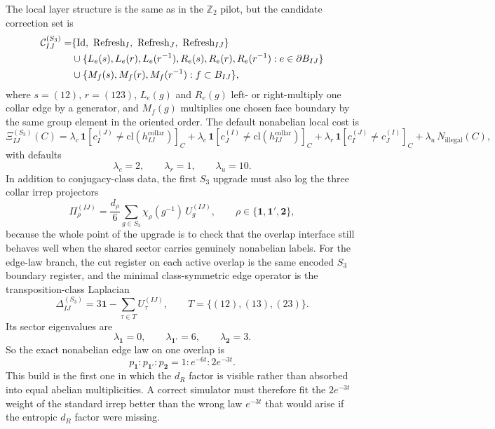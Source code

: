 \documentclass[11pt]{article}
\begin{document}
The local layer structure is the same as in the $\mathbb Z_2$ pilot, but the candidate correction
set is
\begin{align}
\mathcal C_{IJ}^{(S_3)}
=&
\{\mathrm{Id},\ \mathrm{Refresh}_I,\ \mathrm{Refresh}_J,\ \mathrm{Refresh}_{IJ}\}\notag\\
&\cup
\{L_e(s),L_e(r),L_e(r^{-1}),R_e(s),R_e(r),R_e(r^{-1}) : e\in \partial B_{IJ}\}\notag\\
&\cup
\{M_f(s),M_f(r),M_f(r^{-1}) : f\subset B_{IJ}\},
\end{align}
where $s=(12)$, $r=(123)$, $L_e(g)$ and $R_e(g)$ left- or right-multiply one collar edge by a
generator, and $M_f(g)$ multiplies one chosen face boundary by the same group element in the
oriented order. The default nonabelian local cost is
\begin{equation}
\Xi_{IJ}^{(S_3)}(C)
=
\lambda_c\,\mathbf 1[c_I^{(J)}\neq \mathrm{cl}(h_{IJ}^{\mathrm{collar}})]_C
+
\lambda_c\,\mathbf 1[c_J^{(I)}\neq \mathrm{cl}(h_{IJ}^{\mathrm{collar}})]_C
+
\lambda_r\,\mathbf 1[c_I^{(J)}\neq c_J^{(I)}]_C
+
\lambda_u\,N_{\mathrm{illegal}}(C),
\end{equation}
with defaults
\begin{equation}
\lambda_c=2,\qquad \lambda_r=1,\qquad \lambda_u=10.
\end{equation}
In addition to conjugacy-class data, the first $S_3$ upgrade must also log the three collar
irrep projectors
\begin{equation}
\Pi_{\rho}^{(IJ)}
=
\frac{d_{\rho}}{6}\sum_{g\in S_3}\chi_{\rho}(g^{-1})\,U_g^{(IJ)},
\qquad
\rho\in\{\mathbf 1,\mathbf 1',\mathbf 2\},
\end{equation}
because the whole point of the upgrade is to check that the overlap interface still behaves well
when the shared sector carries genuinely nonabelian labels.
For the edge-law branch, the cut register on each active overlap is the same encoded $S_3$
boundary register, and the minimal class-symmetric edge operator is the transposition-class
Laplacian
\begin{equation}
\Delta_{IJ}^{(S_3)}
=
3\mathbf 1-\sum_{\tau\in T}U_{\tau}^{(IJ)},
\qquad
T=\{(12),(13),(23)\}.
\end{equation}
Its sector eigenvalues are
\begin{equation}
\lambda_{\mathbf 1}=0,
\qquad
\lambda_{\mathbf 1'}=6,
\qquad
\lambda_{\mathbf 2}=3.
\end{equation}
So the exact nonabelian edge law on one overlap is
\begin{equation}
p_{\mathbf 1}:p_{\mathbf 1'}:p_{\mathbf 2}
=
1:e^{-6t}:2e^{-3t}.
\end{equation}
This build is the first one in which the $d_R$ factor is visible rather than absorbed into equal
abelian multiplicities. A correct simulator must therefore fit the $2e^{-3t}$ weight of the
standard irrep better than the wrong law $e^{-3t}$ that would arise if the entropic $d_R$
factor were missing.
\end{document}

